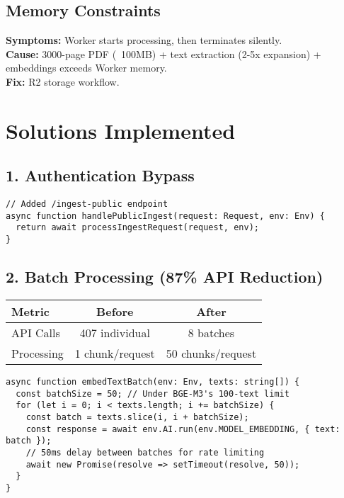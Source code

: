 \documentclass[11pt,a4paper]{article}
\begin{document}
\subsection{Memory Constraints}
\textbf{Symptoms:} Worker starts processing, then terminates silently.\\
\textbf{Cause:} 3000-page PDF (~100MB) + text extraction (2-5x expansion) + embeddings exceeds Worker memory.\\
\textbf{Fix:} R2 storage workflow.

\section{Solutions Implemented}

\subsection{1. Authentication Bypass}
\begin{lstlisting}
// Added /ingest-public endpoint
async function handlePublicIngest(request: Request, env: Env) {
  return await processIngestRequest(request, env);
}
\end{lstlisting}

\subsection{2. Batch Processing (87\% API Reduction)}
\begin{table}[h]
\centering
\begin{tabular}{@{}lcc@{}}
\toprule
\textbf{Metric} & \textbf{Before} & \textbf{After} \\
\midrule
API Calls & 407 individual & 8 batches \\
Processing & 1 chunk/request & 50 chunks/request \\
\bottomrule
\end{tabular}
\end{table}

\begin{lstlisting}
async function embedTextBatch(env: Env, texts: string[]) {
  const batchSize = 50; // Under BGE-M3's 100-text limit
  for (let i = 0; i < texts.length; i += batchSize) {
    const batch = texts.slice(i, i + batchSize);
    const response = await env.AI.run(env.MODEL_EMBEDDING, { text: batch });
    // 50ms delay between batches for rate limiting
    await new Promise(resolve => setTimeout(resolve, 50));
  }
}
\end{lstlisting}
\end{document}
